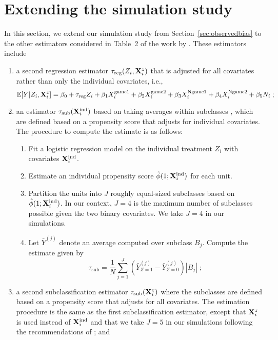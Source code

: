 \documentclass[10pt]{article}
\begin{document}
\section{Extending the simulation study} \label{sec:extension}

In this section, we extend our simulation study from Section~\ref{sec:observedbias} to the other estimators considered in Table~2 of the work by \textcite{Forastiere:2021}. These estimators include
\begin{enumerate}

\item
a second regression estimator $\tau_\text{reg}(Z_i,\mathbf{X}_i^z)$ that is adjusted for all covariates rather than only the individual covariates, i.e.,
\[
\mathbb{E}[Y|Z_i,\mathbf{X}_i^z] = \beta_0 + \tau_\text{reg}Z_i + \beta_1X_i^\text{game1} + \beta_2X_i^\text{game2} + \beta_3X_i^\text{Ngame1} + \beta_4X_i^\text{Ngame2} + \beta_5N_i\;;
\]
\item
an estimator $\tau_\text{sub}(\mathbf{X}^{\text{ind}}_i)$ based on taking averages within subclasses \parencite{Imbens:2015}, which are defined based on a propensity score that adjusts for individual covariates. The procedure to compute the estimate is as follows:
\begin{enumerate}
\item
Fit a logistic regression model on the individual treatment $Z_i$ with covariates $\mathbf{X}^{\text{ind}}_i$.
\item
Estimate an individual propensity score $\hat{\phi}(1;\mathbf{X}^{\text{ind}}_i)$ for each unit.
\item
Partition the units into $J$ roughly equal-sized subclasses based on $\hat{\phi}(1;\mathbf{X}^{\text{ind}}_i)$. In our context, $J=4$ is the maximum number of subclasses possible given the two binary covariates. We take $J=4$ in our simulations.
\item
Let $\bar{Y}^{(j)}$ denote an average computed over subclass $B_j$. Compute the estimate given by
\[
\tau_\text{sub} = \frac{1}{N}\sum_{j=1}^J\left(\bar{Y}_{Z=1}^{(j)}-\bar{Y}_{Z=0}^{(j)}\right)|B_j| \;;
\]
\end{enumerate}

\item
a second subclassification estimator $\tau_\text{sub}(\mathbf{X}^z_i)$ where the subclasses are defined based on a propensity score that adjusts for all covariates. The estimation procedure is the same as the first subclassification estimator, except that $\mathbf{X}^z_i$ is used instead of $\mathbf{X}^{\text{ind}}_i$ and that we take $J=5$ in our simulations following the recommendations of \textcite{Rosenbaum:1984}; and


\end{enumerate}
\end{document}
